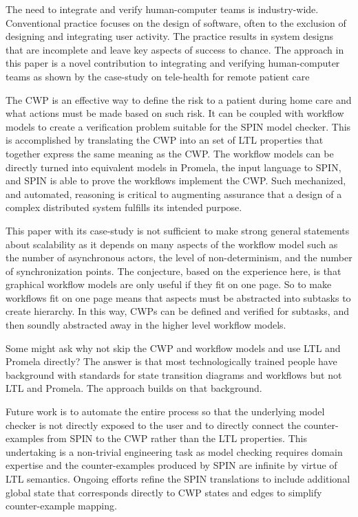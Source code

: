 The need to integrate and verify human-computer teams is industry-wide. Conventional practice focuses on the design of software, often to the exclusion of designing and integrating user activity. The practice results in system designs that are incomplete and leave key aspects of success to chance. The approach in this paper is a novel contribution to integrating and verifying human-computer teams as shown by the case-study on tele-health for remote patient care 

The CWP is an effective way to define the risk to a patient during home care and what actions must be made based on such risk. It can be coupled with workflow models to create a verification problem suitable for the SPIN model checker. This is accomplished by translating the CWP into an set of LTL properties that together express the same meaning as the CWP. The workflow models can be directly turned into equivalent models in Promela, the input language to SPIN, and SPIN is able to prove the workflows implement the CWP. Such mechanized, and automated, reasoning is critical to augmenting assurance that a design of a complex distributed system fulfills its intended purpose. 

This paper with its case-study is not sufficient to make strong general statements about scalability as it depends on many aspects of the workflow model such as the number of asynchronous actors, the level of non-determinism, and the number of synchronization points. The conjecture, based on the experience here, is that graphical workflow models are only useful if they fit on one page. So to make workflows fit on one page means that aspects must be abstracted into subtasks to create hierarchy. In this way, CWPs can be defined and verified for subtasks, and then soundly abstracted away in the higher level workflow models. 

Some might ask why not skip the CWP and workflow models and use LTL and Promela directly? The answer is that most technologically trained people have background with standards for state transition diagrams and workflows but not LTL and Promela. The approach builds on that background.

Future work is to automate the entire process so that the underlying model checker is not directly exposed to the user and to directly connect the counter-examples from SPIN to the CWP rather than the LTL properties. This undertaking is a non-trivial engineering task as model checking requires domain expertise and the counter-examples produced by SPIN are infinite by virtue of LTL semantics. Ongoing efforts refine the SPIN translations to include additional global state that corresponds directly to CWP states and edges to simplify counter-example mapping.
